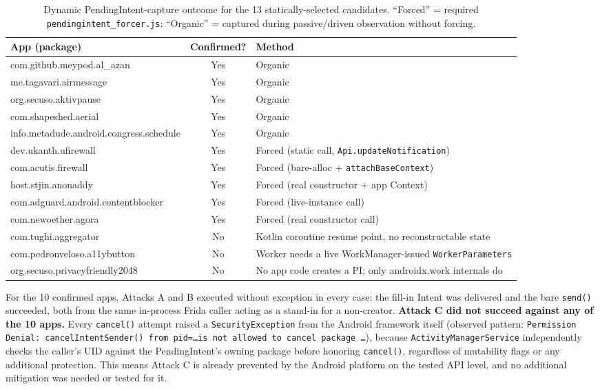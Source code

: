\begin{table}[t]
\centering
\small
\caption{Dynamic PendingIntent-capture outcome for the 13 statically-selected
candidates. ``Forced'' = required \texttt{pendingintent\_forcer.js}; ``Organic'' =
captured during passive/driven observation without forcing.}
\label{tab:rq2b-results}
\begin{tabular}{@{}lcl@{}}
\toprule
\textbf{App (package)} & \textbf{Confirmed?} & \textbf{Method} \\
\midrule
com.github.meypod.al\_azan          & Yes & Organic \\
me.tagavari.airmessage              & Yes & Organic \\
org.secuso.aktivpause                & Yes & Organic \\
com.shapeshed.aerial                 & Yes & Organic \\
info.metadude.android.congress.schedule & Yes & Organic \\
dev.ukanth.ufirewall                 & Yes & Forced (static call, \texttt{Api.updateNotification}) \\
com.acutis.firewall                  & Yes & Forced (bare-alloc + \texttt{attachBaseContext}) \\
host.stjin.anonaddy                  & Yes & Forced (real constructor + app Context) \\
com.adguard.android.contentblocker   & Yes & Forced (live-instance call) \\
com.newoether.agora                  & Yes & Forced (real constructor call) \\
com.tughi.aggregator                 & No  & Kotlin coroutine resume point, no reconstructable state \\
com.pedronveloso.a11ybutton           & No  & Worker needs a live WorkManager-issued \texttt{WorkerParameters} \\
org.secuso.privacyfriendly2048        & No  & No app code creates a PI; only androidx.work internals do \\
\bottomrule
\end{tabular}
\label{tab:rq2b-unresolved}
\end{table}

For the 10 confirmed apps, Attacks A and B executed without exception in every case:
the fill-in Intent was delivered and the bare \texttt{send()} succeeded, both from the
same in-process Frida caller acting as a stand-in for a non-creator. \textbf{Attack C
did not succeed against any of the 10 apps.} Every \texttt{cancel()} attempt raised a
\texttt{SecurityException} from the Android framework itself (observed pattern:
\texttt{Permission Denial: cancelIntentSender() from pid=\ldots is not allowed to cancel
package \ldots}), because \texttt{ActivityManagerService} independently checks the
caller's UID against the PendingIntent's owning package before honoring
\texttt{cancel()}, regardless of mutability flags or any additional protection. This
means Attack C is already prevented by the Android platform on the tested API level,
and no additional mitigation was needed or tested for it.

